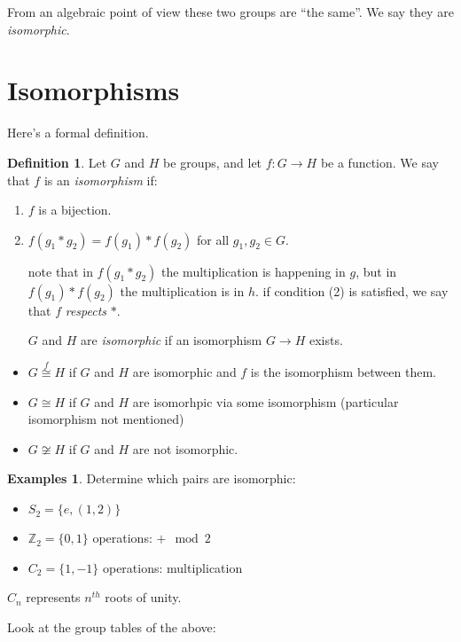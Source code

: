 \documentclass{article}
\theoremstyle{definition}
\newtheorem*{definition}{Definition}
\newtheorem*{exmps}{Examples}
\newcommand{\ism}{\cong}
\begin{document}
From an algebraic point of view these two groups are ``the same''. We say they are \textit{isomorphic}.
\section{Isomorphisms}
Here's a formal definition.\\


\begin{definition}
Let $G$ and $H$ be groups, and let $f : G \rightarrow H$ be a function. We say that $f$ is an \emph{isomorphism} if:
\begin{enumerate}
\item $f$ is a bijection.
\item $f(g_1 * g_2)=f(g_1) * f(g_2) $ for all $g_1, g_2 \in G$.

note that in $f(g_1 * g_2)$ the multiplication is happening in $g$, but in $f(g_1) * f(g_2)$ the multiplication is in $h$. if condition (2) is satisfied, we say that $f$ \emph{respects} $*$.

$G$ and $H$ are \emph{isomorphic} if an isomorphism $G \rightarrow H$ exists.
\end{enumerate}
\end{definition}

\begin{itemize}
  \item 
    $G \overset{f}{\ism} H$ if $G$ and $H$ are isomorphic and $f$ is the isomorphism between them.
  \item
$G \ism H$ if $G$ and $H$ are isomorhpic via some isomorphism (particular isomorphism not mentioned)
  \item 
$G \not\ism H$ if $G$ and $H$ are not isomorphic.\\
\end{itemize}
\begin{exmps}
Determine which pairs are isomorphic:

\begin{itemize}
  \item $S_2=\{e, (1, 2)\}$
  \item $\mathbb{Z}_2=\{0,1\}$ operations: $+\mod 2$
  \item $C_2=\{1,-1\}$ operations: multiplication
\end{itemize}
$C_n$ represents $n^{th}$ roots of unity.
  
\end{exmps}

Look at the group tables of the above:
\end{document}
